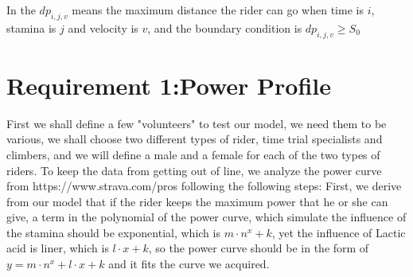\documentclass[12pt]{article}
\begin{document}
In the $dp_{i,j,v}$ means the maximum distance the rider can go when time is $i$, stamina is $j$ and velocity is $v$, and the boundary condition is $dp_{i,j,v}\geqslant S_0$
\section{Requirement 1:Power Profile}
First we shall define a few "volunteers" to test our model, we need them to be various, we shall choose two different types of rider, time trial
specialists and climbers, and we will define a male and a female for each of the two types of riders. %
To keep the data from getting out of line, we analyze the power curve
from https://www.strava.com/pros following the following steps:
First, we derive from our model that if the rider keeps the maximum power that he or she can give, a term in the polynomial of the power curve,  which simulate the influence of the stamina should be exponential,
which is $m\cdot n^x+k$, yet the influence of Lactic acid is liner, which is $l\cdot x+k$, so the power curve should be in the form of $y=m\cdot n^x+l\cdot x+k$
and it fits the curve we acquired.
\end{document}
